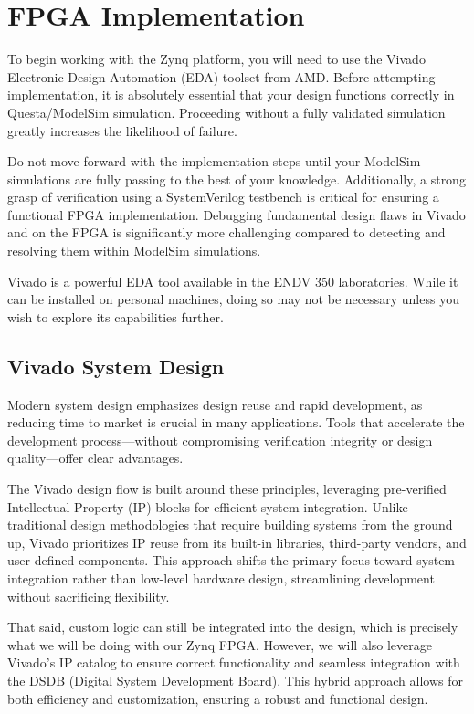 \documentclass{article}
\begin{document}
\section{FPGA Implementation}

To begin working with the Zynq platform, you will need to use the
Vivado Electronic Design Automation (EDA) toolset from AMD. Before
attempting implementation, it is absolutely essential that your design
functions correctly in Questa/ModelSim simulation. Proceeding without
a fully validated simulation greatly increases the likelihood of
failure.

Do not move forward with the implementation steps until your ModelSim
simulations are fully passing to the best of your
knowledge. Additionally, a strong grasp of verification using a
SystemVerilog testbench is critical for ensuring a functional FPGA
implementation. Debugging fundamental design flaws in Vivado and on
the FPGA is significantly more challenging compared to detecting and
resolving them within ModelSim simulations.

Vivado is a powerful EDA tool available in the ENDV 350
laboratories. While it can be installed on personal machines, doing so
may not be necessary unless you wish to explore its capabilities
further.

\subsection{Vivado System Design}

Modern system design emphasizes design reuse and rapid development, as
reducing time to market is crucial in many applications. Tools that
accelerate the development process—without compromising verification
integrity or design quality—offer clear advantages.

The Vivado design flow is built around these principles, leveraging
pre-verified Intellectual Property (IP) blocks for efficient system
integration. Unlike traditional design methodologies that require
building systems from the ground up, Vivado prioritizes IP reuse from
its built-in libraries, third-party vendors, and user-defined
components. This approach shifts the primary focus toward system
integration rather than low-level hardware design, streamlining
development without sacrificing flexibility.

That said, custom logic can still be integrated into the design, which
is precisely what we will be doing with our Zynq FPGA. However, we
will also leverage Vivado's IP catalog to ensure correct functionality
and seamless integration with the DSDB (Digital System Development
Board). This hybrid approach allows for both efficiency and
customization, ensuring a robust and functional design.
\end{document}
